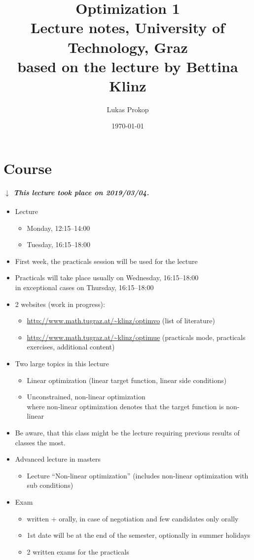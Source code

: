\documentclass[a4paper]{article}
\title{
  Optimization 1 \\
  \large{Lecture notes, University of Technology, Graz} \\
  based on the lecture by Bettina Klinz
}
\date{\today}
\author{Lukas Prokop}
\numberwithin{lecref}{subsection}
\newcounter{exercises}
\newcommand{\dateref}[1]{%
  \begin{mdframed}[backgroundcolor=gray!10,innerbottommargin=0pt,innertopmargin=0pt]
    \paragraph{\textit{$\downarrow$ This lecture took place on #1.}}%
  \end{mdframed}%
}
\begin{document}
\maketitle
\tableofcontents

\section{Course}

\dateref{2019/03/04}

\begin{itemize}
	\item Lecture
	\begin{itemize}
		\item Monday, 12:15--14:00
		\item Tuesday, 16:15--18:00
	\end{itemize}
	\item First week, the practicals session will be used for the lecture
	\item Practicals will take place usually on Wednesday, 16:15--18:00 \\
		in exceptional cases on Thursday, 16:15--18:00
	\item 2 websites (work in progress):
		\begin{itemize}
			\item \url{http://www.math.tugraz.at/~klinz/optimvo} (list of literature)
			\item \url{http://www.math.tugraz.at/~klinz/optimue} (practicals mode, practicals exercises, additional content)
		\end{itemize}
	\item Two large topics in this lecture
		\begin{itemize}
			\item Linear optimization (linear target function, linear side conditions)
			\item Unconstrained, non-linear optimization \\
				where non-linear optimization denotes that the target function is non-linear
		\end{itemize}
	\item Be aware, that this class might be the lecture requiring previous results of classes the most.
	\item Advanced lecture in masters
		\begin{itemize}
			\item Lecture \enquote{Non-linear optimization} (includes non-linear optimization with sub conditions)
		\end{itemize}
	\item Exam
		\begin{itemize}
			\item written + orally, in case of negotiation and few candidates only orally
			\item 1st date will be at the end of the semester, optionally in summer holidays
			\item 2 written exams for the practicals
		\end{itemize}
\end{itemize}
\end{document}

